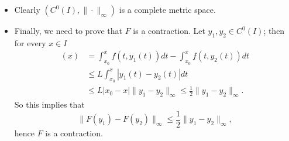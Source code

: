 \begin{example}
\begin{itemize}
\item Clearly $(C^0(I), \|\cdot\|_{\infty})$ is a complete metric space.

\item Finally, we need to prove that $F$ is a contraction. Let $y_1, y_2 \in C^0(I)$; then for every $x\in I$
\begin{align*}
[F(y_1) - F(y_2)](x) &= \int_{x_0}^{x} f(t,y_1(t)) dt - \int_{x_0}^{x} f(t,y_2(t)) dt \\
& \leq L \int_{x_0}^x \left|y_1(t) - y_2(t)\right| dt \\&\leq L|x_0-x| \|y_1-y_2\|_{\infty} \leq \frac12 \|y_1-y_2\|_{\infty}.
\end{align*}%
So this implies that 
$$
\| F(y_1) - F(y_2)\|_{\infty} \leq \frac12 \|y_1-y_2\|_{\infty},
$$
hence $F$ is a contraction.
\end{itemize}



\end{example}







